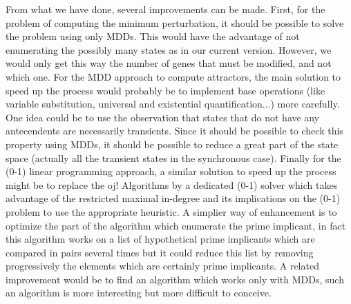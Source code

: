 \documentclass[a4paper,11pt]{article}
\begin{document}
From what we have done, several improvements can be made. First, for the problem
of computing the minimum perturbation, it should be possible to solve the
problem using only MDDs. This would have the advantage of not enumerating the
possibly many states as in our current version. However, we would only get this
way the number of genes that must be modified, and not which one.
For the MDD approach to compute attractors, the main solution to speed up the
process would probably be to implement base operations (like variable substitution, universal and existential quantification...) more carefully.
One idea could be to use the observation that states that do not have any
antecendents are necessarily transients. Since it should be possible to check
this property using MDDs, it should be possible to reduce a great part of the
state space (actually all the transient states in the synchronous case).
Finally for the (0-1) linear programming approach, a similar solution to speed
up the process might be to replace the oj! Algorithms by a dedicated (0-1)
solver which takes advantage of the restricted maximal in-degree and its
implications on the (0-1) problem to use the appropriate heuristic. A simplier
way of enhancement is to optimize the part of the algorithm which enumerate the
prime implicant, in fact this algorithm works on a list of hypothetical prime
implicants which are compared in pairs several times but it could reduce this
list by removing progressively the elements which are certainly prime
implicants. A related improvement would be to find an algorithm which works
only with MDDs, such an algorithm is more interesting but more difficult to
conceive.





\end{document}
